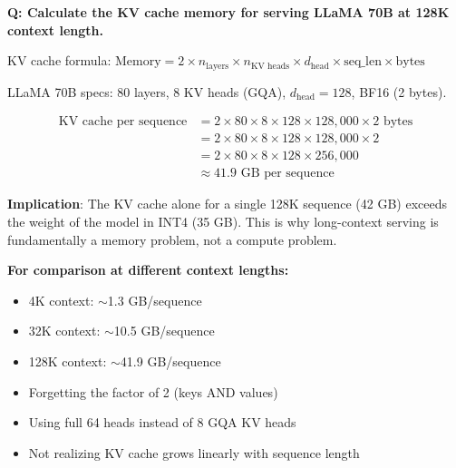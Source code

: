 \begin{interviewq}
\textbf{Q: Calculate the KV cache memory for serving LLaMA 70B at 128K context length.}

 \quad {} \quad \badgefreq{\freqhigh}

\stronganswer

KV cache formula: $\text{Memory} = 2 \times n_{\text{layers}} \times n_{\text{KV heads}} \times d_{\text{head}} \times \text{seq\_len} \times \text{bytes}$

LLaMA 70B specs: 80 layers, 8 KV heads (GQA), $d_{\text{head}} = 128$, BF16 (2 bytes).

\begin{align}
\text{KV cache per sequence} &= 2 \times 80 \times 8 \times 128 \times 128{,}000 \times 2 \text{ bytes} \\
&= 2 \times 80 \times 8 \times 128 \times 128{,}000 \times 2 \\
&= 2 \times 80 \times 8 \times 128 \times 256{,}000 \\
&\approx 41.9 \text{ GB per sequence}
\end{align}

\textbf{Implication}: The KV cache alone for a single 128K sequence (42 GB) exceeds the weight of the model in INT4 (35 GB). This is why long-context serving is fundamentally a memory problem, not a compute problem.

\textbf{For comparison at different context lengths:}
\begin{itemize}
    \item 4K context: $\sim$1.3 GB/sequence
    \item 32K context: $\sim$10.5 GB/sequence
    \item 128K context: $\sim$41.9 GB/sequence
\end{itemize}

\redflags
\begin{itemize}
    \item Forgetting the factor of 2 (keys AND values)
    \item Using full 64 heads instead of 8 GQA KV heads
    \item Not realizing KV cache grows linearly with sequence length
\end{itemize}



\end{interviewq}
